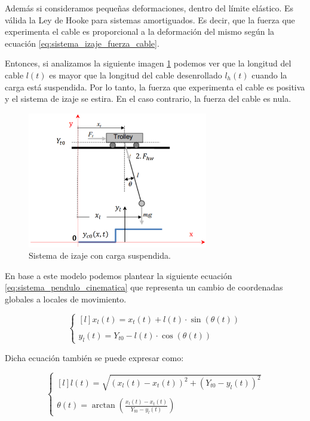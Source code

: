 \documentclass[11pt]{article}
\begin{document}
Además si consideramos pequeñas deformaciones, dentro del límite elástico. Es válida la Ley de Hooke para sistemas amortiguados. Es decir, que la fuerza que experimenta el cable es proporcional a la deformación del mismo según la ecuación \ref{eq:sistema_izaje_fuerza_cable}.

Entonces, si analizamos la siguiente imagen \ref{fig:sistema_pendulo} podemos ver que la longitud del cable $l(t)$ es mayor que la longitud del cable desenrollado $l_{h}(t)$ cuando la carga está suspendida. Por lo tanto, la fuerza que experimenta el cable es positiva y el sistema de izaje se estira. En el caso contrario, la fuerza del cable es nula.

\begin{figure}[h!]
	\centering
	\includegraphics[width=0.7\textwidth]{images/imagen_7_sistema_pendulo.png}
	\caption{Sistema de izaje con carga suspendida.}
	\label{fig:sistema_pendulo}
\end{figure}

\newpage

En base a este modelo podemos plantear la siguiente ecuación \ref{eq:sistema_pendulo_cinematica} que representa un cambio de coordenadas globales a locales de movimiento.

\begin{equation}
	\label{eq:sistema_pendulo_cinematica}
	\left\{
		\begin{matrix*}[l]
		x_{l}(t)=x_{t}(t) + l(t)\cdot \sin(\theta(t))
		\\
		\\ 
		y_{l}(t)=Y_{t0} - l(t)\cdot \cos(\theta(t))
		\end{matrix*}
	\right.
\end{equation}

Dicha ecuación también se puede expresar como:

\begin{equation}
	\label{eq:sistema_pendulo_cinematica_raiz_tangente}
	\left\{
		\begin{matrix*}[l]
		l(t)=\sqrt{\left ( x_{l}(t)-x_{t}(t) \right )^{2}+\left ( Y_{t0}-y_{l}(t) \right )^{2}}
		\\
		\\ 
		\theta(t)=\arctan \left ( \frac{x_{l}(t)-x_{t}(t)}{Y_{t0}-y_{l}(t)} \right )
		\end{matrix*}
	\right.
\end{equation}
\end{document}
